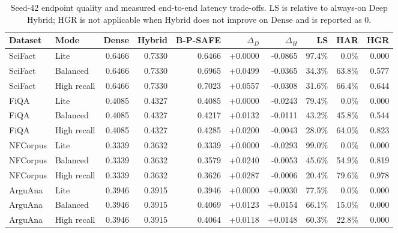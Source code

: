 \begin{table}[t]
\centering
\caption{Seed-42 endpoint quality and measured end-to-end latency trade-offs. LS is relative to always-on Deep Hybrid; HGR is not applicable when Hybrid does not improve on Dense and is reported as 0.}
\label{tab:main_results}
\scriptsize
\setlength{\tabcolsep}{3.2pt}
\begin{tabular}{llrrrrrrrr}
\toprule
Dataset & Mode & Dense & Hybrid & B-P-SAFE & $\Delta_D$ & $\Delta_H$ & LS & HAR & HGR \\
\midrule
SciFact & Lite & 0.6466 & 0.7330 & 0.6466 & +0.0000 & -0.0865 & 97.4\% & 0.0\% & 0.000 \\
SciFact & Balanced & 0.6466 & 0.7330 & 0.6965 & +0.0499 & -0.0365 & 34.3\% & 63.8\% & 0.577 \\
SciFact & High recall & 0.6466 & 0.7330 & 0.7023 & +0.0557 & -0.0308 & 31.6\% & 66.4\% & 0.644 \\
\addlinespace[1pt]
FiQA & Lite & 0.4085 & 0.4327 & 0.4085 & +0.0000 & -0.0243 & 79.4\% & 0.0\% & 0.000 \\
FiQA & Balanced & 0.4085 & 0.4327 & 0.4217 & +0.0132 & -0.0111 & 43.2\% & 45.8\% & 0.544 \\
FiQA & High recall & 0.4085 & 0.4327 & 0.4285 & +0.0200 & -0.0043 & 28.0\% & 64.0\% & 0.823 \\
\addlinespace[1pt]
NFCorpus & Lite & 0.3339 & 0.3632 & 0.3339 & +0.0000 & -0.0293 & 99.0\% & 0.0\% & 0.000 \\
NFCorpus & Balanced & 0.3339 & 0.3632 & 0.3579 & +0.0240 & -0.0053 & 45.6\% & 54.9\% & 0.819 \\
NFCorpus & High recall & 0.3339 & 0.3632 & 0.3626 & +0.0287 & -0.0006 & 20.4\% & 79.6\% & 0.978 \\
\addlinespace[1pt]
ArguAna & Lite & 0.3946 & 0.3915 & 0.3946 & +0.0000 & +0.0030 & 77.5\% & 0.0\% & 0.000 \\
ArguAna & Balanced & 0.3946 & 0.3915 & 0.4069 & +0.0123 & +0.0154 & 66.1\% & 15.0\% & 0.000 \\
ArguAna & High recall & 0.3946 & 0.3915 & 0.4064 & +0.0118 & +0.0148 & 60.3\% & 22.8\% & 0.000 \\
\bottomrule
\end{tabular}
\end{table}
